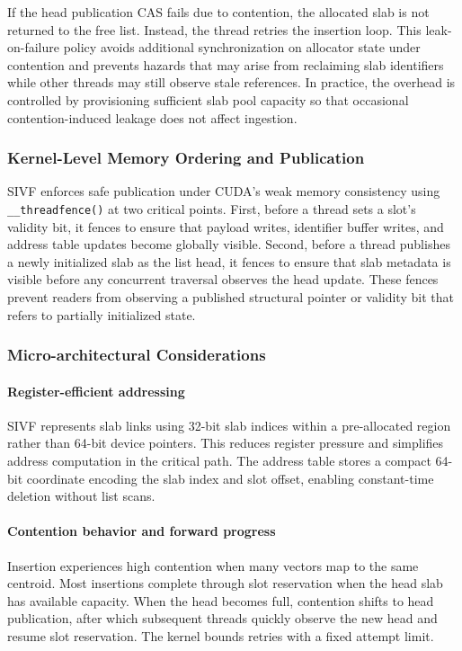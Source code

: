 \documentclass[sigconf,nonacm]{acmart}
\theoremstyle{plain}
\theoremstyle{definition}
\theoremstyle{remark}
\begin{document}
If the head publication CAS fails due to contention, the allocated slab is not returned to the free list. Instead, the thread retries the insertion loop. This leak-on-failure policy avoids additional synchronization on allocator state under contention and prevents hazards that may arise from reclaiming slab identifiers while other threads may still observe stale references. In practice, the overhead is controlled by provisioning sufficient slab pool capacity so that occasional contention-induced leakage does not affect ingestion.

\subsubsection{Kernel-Level Memory Ordering and Publication}
\label{sec:kernel_impl}

SIVF enforces safe publication under CUDA's weak memory consistency using \verb|__threadfence()| at two critical points. First, before a thread sets a slot's validity bit, it fences to ensure that payload writes, identifier buffer writes, and address table updates become globally visible. Second, before a thread publishes a newly initialized slab as the list head, it fences to ensure that slab metadata is visible before any concurrent traversal observes the head update. These fences prevent readers from observing a published structural pointer or validity bit that refers to partially initialized state.

\subsubsection{Micro-architectural Considerations}
\label{sub:micro_arch}

\paragraph{Register-efficient addressing}
SIVF represents slab links using 32-bit slab indices within a pre-allocated region rather than 64-bit device pointers. This reduces register pressure and simplifies address computation in the critical path. The address table stores a compact 64-bit coordinate encoding the slab index and slot offset, enabling constant-time deletion without list scans.

\paragraph{Contention behavior and forward progress}
Insertion experiences high contention when many vectors map to the same centroid. Most insertions complete through slot reservation when the head slab has available capacity. When the head becomes full, contention shifts to head publication, after which subsequent threads quickly observe the new head and resume slot reservation. The kernel bounds retries with a fixed attempt limit.
\end{document}
